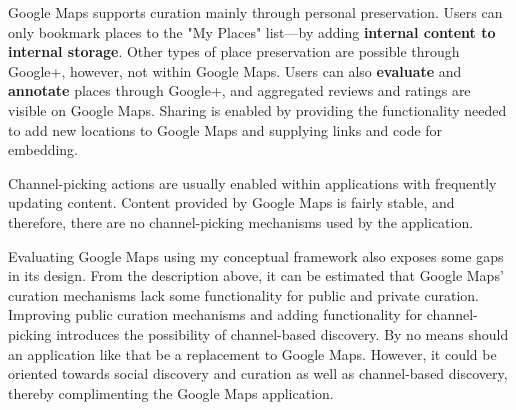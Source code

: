 {Google Maps supports curation mainly through personal preservation. Users can only bookmark places to the "My Places" list---by adding \textbf{internal content to internal storage}. Other types of place preservation are possible through Google+, however, not within Google Maps. Users can also \textbf{evaluate} and \textbf{annotate} places through Google+, and aggregated reviews and ratings are visible on Google Maps. Sharing is enabled by providing the functionality needed to add new locations to Google Maps and supplying links and code for embedding.  

Channel-picking actions are usually enabled within applications with frequently updating content. Content provided by Google Maps is fairly stable, and therefore, there are no channel-picking mechanisms used by the application.

Evaluating Google Maps using my conceptual framework also exposes some gaps in its design. From the description above, it can be estimated that Google Maps' curation mechanisms lack some functionality for public and private curation. Improving public curation mechanisms and adding functionality for channel-picking introduces the possibility of channel-based discovery. By no means should an application like that be a replacement to Google Maps. However, it could be oriented towards social discovery and curation as well as channel-based discovery, thereby complimenting the Google Maps application.  

} %


